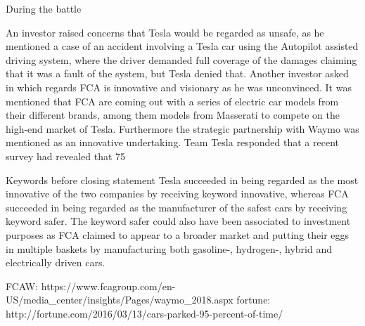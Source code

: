 During the battle

An investor raised concerns that Tesla would be regarded as unsafe, as he mentioned a case of an accident involving a Tesla car using the Autopilot assisted driving system, where the driver demanded full coverage of the damages claiming that it was a fault of the system, but Tesla denied that. Another investor asked in which regards FCA is innovative and visionary as he was unconvinced. It was mentioned that FCA are coming out with a series of electric car models from their different brands, among them models from Masserati to compete on the high-end market of Tesla. Furthermore the strategic partnership with Waymo was mentioned as an innovative undertaking. Team Tesla responded that a recent survey had revealed that 75%

Keywords before closing statement
Tesla succeeded in being regarded as the most innovative of the two companies by receiving keyword innovative, whereas FCA succeeded in being regarded as the manufacturer of the safest cars by receiving keyword safer. The keyword safer could also have been associated to investment purposes as FCA claimed to appear to a broader market and putting their eggs in multiple baskets by manufacturing both gasoline-, hydrogen-, hybrid and electrically driven cars.

FCAW: https://www.fcagroup.com/en-US/media_center/insights/Pages/waymo_2018.aspx
fortune: http://fortune.com/2016/03/13/cars-parked-95-percent-of-time/